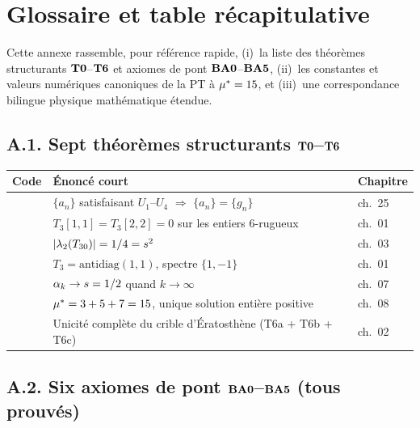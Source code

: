 \section{Glossaire et table récapitulative}
\label{app:glossaire}

Cette annexe rassemble, pour référence rapide, (i)~la liste des théorèmes structurants $\textbf{T0}$--$\textbf{T6}$ et axiomes de pont $\textbf{BA0}$--$\textbf{BA5}$, (ii)~les constantes et valeurs numériques canoniques de la PT à $\mu^{*} = 15$, et (iii)~une correspondance bilingue physique\,\textendash\,mathématique étendue.

\subsection*{A.1. Sept théorèmes structurants $\textbf{T0}$--$\textbf{T6}$}

\begin{table}[htbp]
\centering
\small
\begin{tabular}{@{}lll@{}}
\toprule
Code & Énoncé court & Chapitre \\
\midrule
\Tzero{} & $\{a_n\}$ satisfaisant $U_1$--$U_4$ $\Longrightarrow$ $\{a_n\} = \{g_n\}$ & ch.~25 \\
\Tone{} & $T_3[1,1] = T_3[2,2] = 0$ sur les entiers $6$-rugueux & ch.~01 \\
\Ttwo{} & $|\lambda_2(T_{30})| = 1/4 = s^2$ & ch.~03 \\
\Tthree{} & $T_3 = \mathrm{antidiag}(1,1)$, spectre $\{1, -1\}$ & ch.~01 \\
\Tfour{} & $\alpha_k \to s = 1/2$ quand $k \to \infty$ & ch.~07 \\
\Tfive{} & $\mu^{*} = 3 + 5 + 7 = 15$, unique solution entière positive & ch.~08 \\
\Tsix{} & Unicité complète du crible d'Ératosthène (T6a + T6b + T6c) & ch.~02 \\
\bottomrule
\end{tabular}
\end{table}

\subsection*{A.2. Six axiomes de pont $\textbf{BA0}$--$\textbf{BA5}$ (tous prouvés)}

